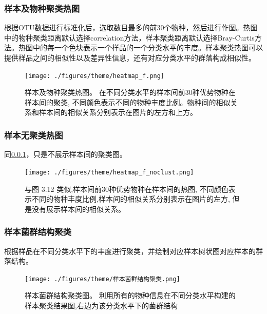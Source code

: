 \documentclass[a4paper,10pt]{article}
\numberwithin{figure}{section}
\numberwithin{table}{section}
\begin{document}
\subsubsection{样本及物种聚类热图}
\label{Subsubsec：clusteringheatmap}
根据OTU数据进行标准化后，选取数目最多的前30个物种，然后进行作图。热图中的物种聚类距离默认选择correlation方法，样本聚类距离默认选择Bray-Curtis方法。热图中的每一个色块表示一个样品的一个分类水平的丰度。样本聚类热图可以提供样品之间的相似性以及差异性信息，还有对应分类水平的群落构成相似性。
\begin{figure}[H]
\centering
\label{Fig:clusteringHeatMap}
\captionsetup{width=.8\textwidth,singlelinecheck = false, justification=justified}
 \texttt{[image: ./figures/theme/heatmap\_f.png]}  
   \caption{样本及物种聚类热图。 在不同分类水平的样本间前30种优势物种在样本间的聚类, 不同颜色表示不同的物种丰度比例。物种间的相似关系和样本间的相似关系分别表示在图片的左方和上方。}
\end{figure}

\newpage
\subsubsection{样本无聚类热图}
\label{Subsubsec：non-clusteringheatmap}
同\ref{Subsubsec：clusteringheatmap}，只是不展示样本间的聚类图。
\begin{figure}[H]
\centering
\label{Fig:clusteringheatmapnoclust}
\captionsetup{width=.8\textwidth,singlelinecheck = false, justification=justified}
 \texttt{[image: ./figures/theme/heatmap\_f\_noclust.png]}  
   \caption{与图 3.12 类似,样本间前30种优势物种在样本间的热图, 不同颜色表示不同的物种丰度比例,样本间的相似关系分别表示在图片的左方, 但是没有展示样本间的相似关系。}
\end{figure}

\newpage
\subsubsection{样本菌群结构聚类}
\label{Subsubsec:biota}
根据样品在不同分类水平下的丰度进行聚类，并绘制对应样本树状图对应样本的群落结构。

\begin{figure}[H]
\centering
\label{Fig:clusteringbiota}
\captionsetup{width=.8\textwidth,singlelinecheck = false, justification=justified}
 \texttt{[image: ./figures/theme/样本菌群结构聚类.png]}  
   \caption{样本菌群结构聚类图。 利用所有的物种信息在不同分类水平构建的样本聚类结果图,右边为该分类水平下的菌群结构}
\end{figure}
\newpage
\end{document}
